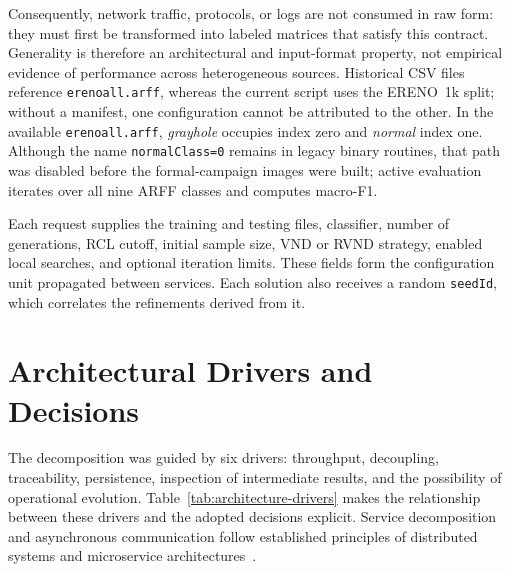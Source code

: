 Consequently, network traffic, protocols, or logs are not consumed in raw form: they must first be transformed into labeled matrices that satisfy this contract. Generality is therefore an architectural and input-format property, not empirical evidence of performance across heterogeneous sources. Historical CSV files reference \texttt{erenoall.arff}, whereas the current script uses the ERENO~1k split; without a manifest, one configuration cannot be attributed to the other. In the available \texttt{erenoall.arff}, \textit{grayhole} occupies index zero and \textit{normal} index one. Although the name \texttt{normalClass=0} remains in legacy binary routines, that path was disabled before the formal-campaign images were built; active evaluation iterates over all nine ARFF classes and computes macro-F1.

Each request supplies the training and testing files, classifier, number of generations, RCL cutoff, initial sample size, VND or RVND strategy, enabled local searches, and optional iteration limits. These fields form the configuration unit propagated between services. Each solution also receives a random \texttt{seedId}, which correlates the refinements derived from it.

\section{Architectural Drivers and Decisions}

The decomposition was guided by six drivers: throughput, decoupling, traceability, persistence, inspection of intermediate results, and the possibility of operational evolution. Table~\ref{tab:architecture-drivers} makes the relationship between these drivers and the adopted decisions explicit. Service decomposition and asynchronous communication follow established principles of distributed systems and microservice architectures~\cite{Tanenbaum2007Distributed,Newman2021,Kreps2011}.

